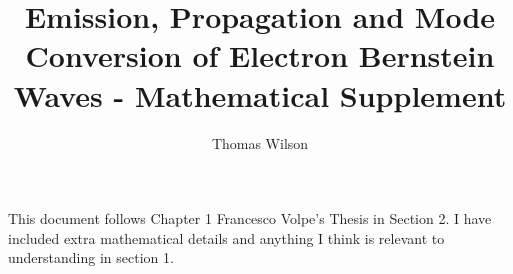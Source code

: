 \documentclass[a4paper, 12pt]{article}
\begin{document}
\title{Emission, Propagation and Mode Conversion of Electron Bernstein Waves - Mathematical Supplement}
\author{Thomas Wilson}
\maketitle{}
This document follows Chapter 1 Francesco Volpe's Thesis \cite{volpe_phd_thesis} in Section 2. I have included extra mathematical details and anything I think is relevant to understanding in section 1.









\printbibliography
\end{document}
